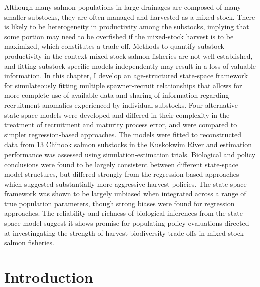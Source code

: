 \documentclass[12pt,]{book}
\theoremstyle{definition}
\theoremstyle{definition}
\theoremstyle{definition}
\theoremstyle{remark}
\begin{document}
\noindent
Although many salmon populations in large drainages are composed of many
smaller substocks, they are often managed and harvested as a
mixed-stock. There is likely to be heterogeneity in productivity among
the substocks, implying that some portion may need to be overfished if
the mixed-stock harvest is to be maximized, which constitutes a
trade-off. Methods to quantify substock productivity in the context
mixed-stock salmon fisheries are not well established, and fitting
substock-specific models independently may result in a loss of valuable
information. In this chapter, I develop an age-structured state-space
framework for simulateously fitting multiple spawner-recruit
relationships that allows for more complete use of available data and
sharing of information regarding recruitment anomalies experienced by
individual substocks. Four alternative state-space models were developed
and differed in their complexity in the treatment of recruitment and
maturity process error, and were compared to simpler regression-based
approaches. The models were fitted to reconstructed data from 13 Chinook
salmon substocks in the Kuskokwim River and estimation performance was
assessed using simulation-estimation trials. Biological and policy
conclusions were found to be largely consistent between different
state-space model structures, but differed strongly from the
regression-based approaches which suggested substantially more
aggressive harvest policies. The state-space framework was shown to be
largely unbiased when integrated across a range of true population
parameters, though strong biases were found for regression approaches.
The reliability and richness of biological inferences from the
state-space model suggest it shows promise for populating policy
evaluations directed at investingating the strength of
harvest-biodiversity trade-offs in mixed-stock salmon fisheries.

\section{Introduction}\label{introduction-2}
\end{document}
